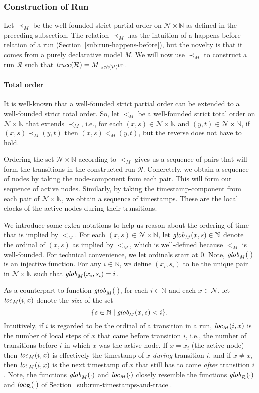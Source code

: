 \documentclass{tlp}
\newcommand{\Nat}{\mathbb{N}}  \newcommand{\len}[1]{|#1|} \newcommand{\rom}[1]{\text{\emph{(#1)}}} \newcommand{\romI}{\rom i}
\newcommand{\ded}{\mathcal{P}}
\newcommand{\proj}[2]{#1|_{#2}}
\newcommand{\schof}[1]{\fname{sch}(#1)}
\newcommand{\nw}{\mathcal{N}}
\newcommand{\toloct}[1]{#1^{\mathrm{LT}}}
\newcommand{\run}{\mathcal{R}}
\newcommand{\trace}[1]{\fname{trace}(#1)}
\newcommand{\locR}[1]{\fname{loc}_{\run}(#1)}
\newcommand{\globR}[1]{\fname{glob}_{\run}(#1)}
\newcommand{\nwnat}{\nw\times\Nat}
\newcommand{\cauM}{\prec_{M}}
\newcommand{\totM}{<_{M}}
\newcommand{\globM}[1]{\fname{glob}_{M}(#1)}
\newcommand{\locM}[1]{\fname{loc}_{M}(#1)}
\begin{document}
\subsubsection{Construction of Run}

\label{sub:construction-of-run}

Let $\cauM$ be the well-founded strict partial order on $\nwnat$
as defined in the preceding subsection. The relation $\cauM$ has
the intuition of a happens-before relation of a run (Section~\ref{sub:run-happens-before}),
but the novelty is that it comes from a purely declarative model $M$.
We will now use $\cauM$ to construct a run $\run$ such that $\trace{\run}=\proj M{\toloct{\schof{\ded}}}$. 


\paragraph*{Total order}

It is well-known that a well-founded strict partial order can be extended
to a well-founded strict total order. So, let $\totM$ be a well-founded
strict total order on $\nwnat$ that extends $\cauM$, i.e., for each
$(x,s)\in\nwnat$ and $(y,t)\in\nwnat$, if $(x,s)\cauM(y,t)$ then
$(x,s)\totM(y,t)$, but the reverse does not have to hold. 

Ordering the set $\nwnat$ according to $\totM$ gives us a sequence
of pairs that will form the transitions in the constructed run $\run$.
Concretely, we obtain a sequence of nodes by taking the node-component
from each pair. This will form our sequence of active nodes. Similarly,
by taking the timestamp-component from each pair of $\nwnat$, we
obtain a sequence of timestamps. These are the local clocks of the
active nodes during their transitions. 

We introduce some extra notations to help us reason about the ordering
of time that is implied by $\totM$. For each $(x,s)\in\nwnat$, let
$\globM{x,s}\in\Nat$ denote the ordinal of $(x,s)$ as implied by
$\totM$, which is well-defined because $\totM$ is well-founded.
For technical convenience, we let ordinals start at $0$. Note, $\globM{\cdot}$
is an injective function. For any $i\in\Nat$, we define $(x_{i},s_{i})$
to be the unique pair in $\nwnat$ such that $\globM{x_{i},s_{i}}=i$.

As a counterpart to function $\globM{\cdot}$, for each $i\in\Nat$
and each $x\in\nw$, let $\locM{i,x}$ denote the \emph{size} of
the set 
\[
\{s\in\Nat\mid\globM{x,s}<i\}.
\]
Intuitively, if $i$ is regarded to be the ordinal of a transition
in a run, $\locM{i,x}$ is the number of local steps of $x$ that
came before transition $i$, i.e., the number of transitions before
$i$ in which $x$ was the active node. If $x=x_{i}$ (the active
node) then $\locM{i,x}$ is effectively the timestamp of $x$ \emph{during}
transition $i$, and if $x\neq x_{i}$ then $\locM{i,x}$ is the next
timestamp of $x$ that still has to come \emph{after} transition
$i$. Note, the functions $\globM{\cdot}$ and $\locM{\cdot}$ closely
resemble the functions $\globR{\cdot}$ and $\locR{\cdot}$ of Section~\ref{sub:run-timestamps-and-trace}.
\end{document}

